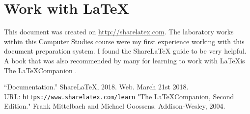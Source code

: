 \documentclass{report}
\begin{document}
\section{Work with \LaTeX}
This document was created on \url{http://sharelatex.com}. The laboratory works within this Computer Studies course were my first experience working with this document preparation system. I found the ShareLaTeX guide \cite{web1} to be very helpful. A book that was also recommended by many for learning to work with \LaTeX is The \LaTeX Companion \cite{book1}.
\begin{thebibliography}{9}
“Documentation.” ShareLaTeX, 2018. Web. March 21st 2018. \\
URL: \texttt{https://www.sharelatex.com/learn}
"The \LaTeX Companion, Second Edition." Frank Mittelbach and Michael Goossens. Addison-Wesley, 2004.
\end{thebibliography}
\end{document}
